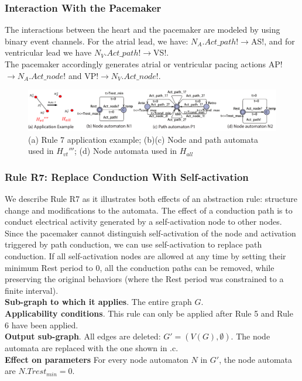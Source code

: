 \subsubsection{Interaction With the Pacemaker}
The interactions between the heart and the pacemaker are modeled by using binary event channels. For the atrial lead, we have:
\textsf{$N_A.Act\_path!\rightarrow$AS!},
and for ventricular lead we have
\textsf{$N_V.Act\_path!\rightarrow$VS!}.\\
The pacemaker accordingly generates atrial or ventricular pacing actions \textsf{AP!$\rightarrow N_A.Act\_node!$} and \textsf{VP!$\rightarrow N_V.Act\_node!$}.

\begin{figure}[!t]
	\centering
	\includegraphics[width=1.05\textwidth]{figs/rule5.pdf}
	\caption{\small (a) Rule 7 application example; (b)(c) Node and path automata used in $H_{vt}'''$; (d) Node automata used in $H_{all}$ }
	\vspace{-15pt}
	\label{fig:rule5}
\end{figure}

\subsubsection{Rule R7: Replace Conduction With Self-activation}
We describe Rule R7 as it illustrates both effects of an abstraction rule: structure change and modifications to the automata.
The effect of a conduction path is to conduct electrical activity generated by a self-activation node to other nodes. Since the pacemaker cannot distinguish self-activation of the node and activation triggered by path conduction, we can use self-activation to replace path conduction.
If all self-activation nodes are allowed at any time by setting their minimum Rest period to 0, all the conduction paths can be removed, while preserving the original behaviors (where the Rest period was constrained to a finite interval).\\
\textbf{Sub-graph to which it applies}.
The entire graph $G$.\\
\textbf{Applicability conditions}.
This rule can only be applied after Rule 5 and Rule 6 have been applied.\\
\textbf{Output sub-graph}.
All edges are deleted: $G' = (V(G), \emptyset)$. The node automata are replaced with the one shown in .c.\\
\textbf{Effect on parameters}
For every node automaton $N$ in $G'$, the node automata are $N.Trest_{min}=0$.\\

